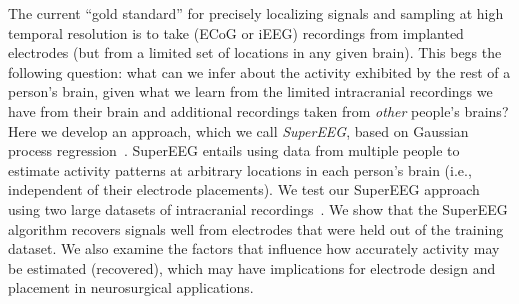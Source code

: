 \documentclass[11pt]{article}
\begin{document}
The current ``gold standard'' for precisely localizing signals and
sampling at high temporal resolution is to take (ECoG or iEEG)
recordings from implanted electrodes (but from a limited set of
locations in any given brain).  This begs the following question: what
can we infer about the activity exhibited by the rest of a person's
brain, given what we learn from the limited intracranial recordings we
have from their brain and additional recordings taken from
\textit{other} people's brains?  Here we develop an approach, which we
call \textit{SuperEEG}, based on Gaussian process
regression~\cite{Rasm06}.  SuperEEG entails using data from multiple
people to estimate activity patterns at arbitrary locations in each
person's brain (i.e., independent of their electrode placements).  We
test our SuperEEG approach using two large datasets of intracranial
recordings~\cite{SedeEtal03, SedeEtal07a, SedeEtal07b, MannEtal11,
  MannEtal12, EzzyEtal17, HoraEtal17, KragEtal17, KuceEtal17,
  LinEtal17, SoloEtal18, WeidEtal18, EzzyEtal18, KuceEtal18}.  We show
that the SuperEEG algorithm recovers signals well from electrodes that
were held out of the training dataset.  We also examine the factors
that influence how accurately activity may be estimated (recovered),
which may have implications for electrode design and
placement in neurosurgical applications.
\end{document}
